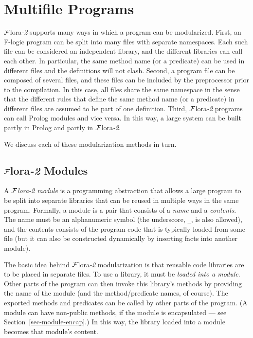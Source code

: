\documentclass[11pt]{article}
\newcommand{\FLORA}{{\mbox{\sc ${\cal F}${lora}\rm\emph{-2}}}\xspace}
\newcommand{\fl}{\mbox{F-logic}\xspace}
\begin{document}
\section{Multifile Programs}

\FLORA supports many ways in which a program can be modularized.  First, an
\fl program can be split into many files with separate namespaces. Each
such file can be considered an independent library, and the different
libraries can call each other. In particular, the same method name (or a
predicate) can be used in different files and the definitions will not
clash.  Second, a program file can be composed of several files, and these
files can be included by the preprocessor prior to the compilation. In this
case, all files share the same namespace in the sense that the different
rules that define the same method name (or a predicate) in different files
are assumed to be part of one definition. Third, \FLORA programs can call
Prolog modules and vice versa. In this way, a large system can be built partly
in Prolog and partly in \FLORA.

We discuss each of these modularization methods in turn.


\subsection{\FLORA Modules} \label{sec:flora-modules}

A \emph{\FLORA module} is a programming abstraction that allows a large
program to be split into separate libraries that can be reused in multiple
ways in the same program. Formally, a module is a pair that consists of a
\emph{name} and a \emph{contents}. The name must be an alphanumeric symbol
(the underscore, {\tt \_}, is also allowed), and the contents consists of
the program code that is typically loaded from some file (but it can also
be constructed dynamically by inserting facts
into another module).

The basic idea behind \FLORA modularization is that reusable code libraries
are to be placed in separate files.  To use a library, it must be
\emph{loaded into a module}. Other parts of the program can then invoke
this library's methods by providing the name of the module (and the
method/predicate names, of course).  
The exported methods and predicates can be called by other
parts of the program. (A module can have non-public methods, if the module
is encapsulated ---
see Section~\ref{sec-module-encap}.)
In this way, the library loaded into a module becomes that module's content.
\end{document}
